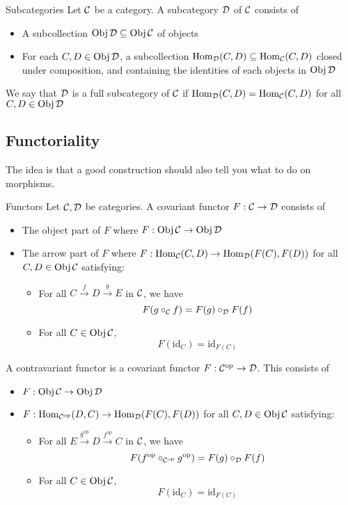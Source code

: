 \documentclass[a4paper]{article}
\begin{document}
\begin{defn}{Subcategories}{} Let $\mathcal{C}$ be a category. A subcategory $\mathcal{D}$ of $\mathcal{C}$ consists of 
\begin{itemize}
\item A subcollection $\operatorname{Obj}\mathcal{D}\subseteq\operatorname{Obj}\mathcal{C}$ of objects
\item For each $C,D\in\operatorname{Obj}\mathcal{D}$, a subcollection $\operatorname{Hom}_{\mathcal{D}}(C,D)\subseteq\operatorname{Hom}_{\mathcal{C}}(C,D)$ closed under composition, and containing the identities of each objects in $\operatorname{Obj}\mathcal{D}$
\end{itemize}
We say that $\mathcal{D}$ is a full subcategory of $\mathcal{C}$ if $\operatorname{Hom}_{\mathcal{D}}(C,D)=\operatorname{Hom}_{\mathcal{C}}(C,D)$ for all $C,D\in\operatorname{Obj}\mathcal{D}$
\end{defn}

\subsection{Functoriality}
The idea is that a good construction should also tell you what to do on morphisms. 

\begin{defn}{Functors}{} Let $\mathcal{C},\mathcal{D}$ be categories. A covariant functor $F:\mathcal{C}\to\mathcal{D}$ consists of 
\begin{itemize}
\item The object part of $F$ where $F:\operatorname{Obj}\mathcal{C}\to\operatorname{Obj}\mathcal{D}$
\item The arrow part of $F$ where $F:\operatorname{Hom}_{\mathcal{C}}(C,D)\to\operatorname{Hom}_{\mathcal{D}}(F(C),F(D))$ for all $C,D\in\operatorname{Obj}\mathcal{C}$ satisfying:
\begin{itemize}
\item For all $C\overset{f}{\rightarrow}D\overset{g}{\rightarrow}E$ in $\mathcal{C}$, we have $$F(g\circ_{\mathcal{C}} f)=F(g)\circ_{\mathcal{D}} F(f)$$
\item For all $C\in\operatorname{Obj}\mathcal{C}$, $$F(\text{id}_C)=\text{id}_{F(C)}$$
\end{itemize}
\end{itemize}
A contravariant functor is a covariant functor $F:\mathcal{C}^\text{op}\to\mathcal{D}$. This consists of 
\begin{itemize}
\item $F:\operatorname{Obj}\mathcal{C}\to\operatorname{Obj}\mathcal{D}$
\item $F:\operatorname{Hom}_{\mathcal{C}^{\text{op}}}(D,C)\to\operatorname{Hom}_{\mathcal{D}}(F(C),F(D))$ for all $C,D\in\operatorname{Obj}\mathcal{C}$ satisfying:
\begin{itemize}
\item For all $E\overset{g^{\text{op}}}{\rightarrow}D\overset{f^{\text{op}}}{\rightarrow}C$ in $\mathcal{C}$, we have $$F(f^{\text{op}}\circ_{\mathcal{C}^{\text{op}}}g^{\text{op}})=F(g)\circ_{\mathcal{D}} F(f)$$
\item For all $C\in\operatorname{Obj}\mathcal{C}$, $$F(\text{id}_C)=\text{id}_{F(C)}$$
\end{itemize}
\end{itemize}
\end{defn}
\end{document}
